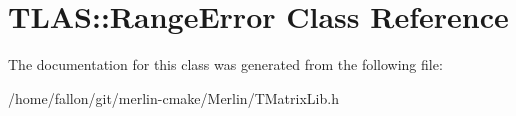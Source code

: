 \hypertarget{classTLAS_1_1RangeError}{}\section{T\+L\+AS\+:\+:Range\+Error Class Reference}
\label{classTLAS_1_1RangeError}


The documentation for this class was generated from the following file\+:\begin{DoxyCompactItemize}
\item 
/home/fallon/git/merlin-\/cmake/\+Merlin/T\+Matrix\+Lib.\+h\end{DoxyCompactItemize}
